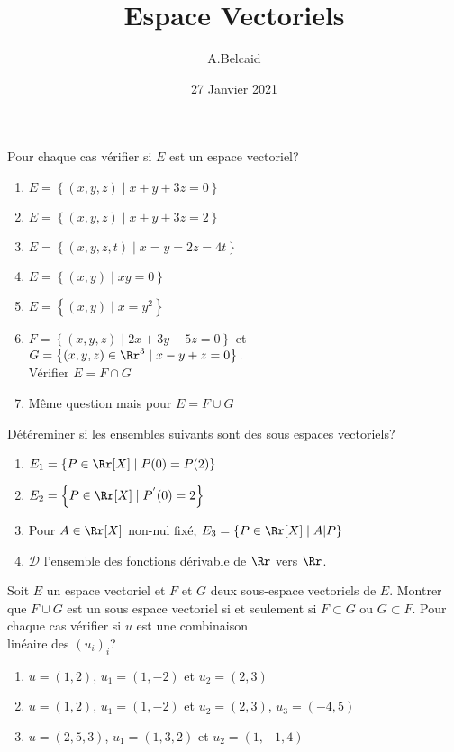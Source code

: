 \documentclass[10pt, a4paper, twocolumn]{homework}
\title{Espace Vectoriels}
\date{27 Janvier 2021}
\author{A.Belcaid}
\begin{document}
\maketitle


Pour chaque cas vérifier si $E$ est un espace vectoriel?

\begin{enumerate}
  \item $E = \left\{(x,y,z)\;|\; x+y +3z = 0\right\}$
  \item $E = \left\{(x,y,z)\;|\; x+y +3z = 2\right\}$
  \item $E = \left\{(x,y,z,t)\;|\; x=y=2z=4t\right\}$
  \item $E = \left\{(x,y)\;|\; xy=0\right\}$
  \item $E = \left\{(x,y)\;|\; x=y^2\right\}$
  \item $F = \left\{(x,y,z)\;|\; 2x+3y-5z=0\right\}$ et\\ $G
    =\left\{(x,y,z)\in \Rr^3\;|\; x-y+z=0\right\}.$\\[4pt]
    Vérifier $E = F\cap G$
  \item Même question mais pour $E = F \cup G$

\end{enumerate}
Détéreminer si les ensembles suivants sont des sous espaces vectoriels?

\begin{enumerate}
  \item $E_1 = \left\{P\in \Rr[X]\;|\; P(0) = P(2)\right\}$
  \item $E_2 = \left\{P\in \Rr[X]\;|\; P^{'}(0) = 2\right\}$
  \item Pour $A\in \Rr[X]$ non-nul fixé, $E_3=\left\{P\in
    \Rr[X]\;|\; A|P\right\}$
  \item $\mathcal{D}$ l'ensemble des fonctions dérivable de $\Rr$ vers
    $\Rr$.
\end{enumerate}

Soit $E$ un espace vectoriel et $F$ et $G$ deux sous-espace vectoriels de $E$.
Montrer que $F\cup G$ est un sous espace vectoriel si et seulement si
$F\subset G$ ou $G\subset F$.
Pour chaque cas vérifier si $u$ est une combinaison\\ linéaire des
$(u_i)_i$?
\begin{enumerate}
  \item $u=(1,2)$, $u_1=(1,-2)$ et $u_2=(2,3)$
  \item $u=(1,2)$, $u_1=(1,-2)$ et $u_2=(2,3)$, $u_3=(-4,5)$
  \item $u=(2,5,3)$, $u_1=(1,3,2)$ et $u_2=(1,-1,4)$
\end{enumerate}
\end{document}
